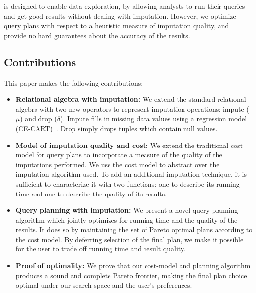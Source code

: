 \ProjectName{} is designed to enable data exploration, by allowing analysts to run their queries and get good results without dealing with imputation.
However, we optimize query plans with respect to a heuristic measure of imputation quality, and provide no hard guarantees about the accuracy of the results.

\subsection{Contributions}
This paper makes the following contributions:
\begin{itemize}
\item \textbf{Relational algebra with imputation:}
  We extend the standard relational algebra with two new operators to represent imputation operations: impute ($\mu$) and drop ($\delta$).
  Impute fills in missing data values using a regression model (CE-CART)~\cite{burgette2010multiple}.
  Drop simply drops tuples which contain null values.
\item \textbf{Model of imputation quality and cost:}
  We extend the traditional cost model for query plans to incorporate a measure of the quality of the imputations performed.
  We use the cost model to abstract over the imputation algorithm used.
  To add an additional imputation technique, it is sufficient to characterize it with two functions: one to describe its running time and one to describe the quality of its results.
\item \textbf{Query planning with imputation:}
  We present a novel query planning algorithm which jointly optimizes for running time and the quality of the results.
  It does so by maintaining the set of Pareto optimal plans according to the cost model.
  By deferring selection of the final plan, we make it possible for the user to trade off running time and result quality.
\item \textbf{Proof of optimality:}
 We prove that our cost-model and planning algorithm produces a sound and complete Pareto frontier, making the final plan choice optimal under our search space and the user's preferences.
\end{itemize}



